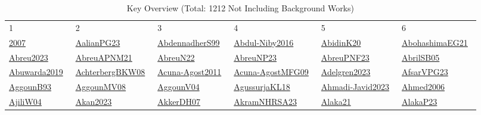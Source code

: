 \begin{longtable}{*{6}{l}}
\rowcolor{white}\caption{Key Overview (Total: 1212 Not Including Background Works)}\\ \toprule
\rowcolor{white}1 & 2 & 3 & 4 & 5 & 6\\ \midrule
\endhead
\bottomrule
\endfoot
\href{../}{2007}~\cite{2007} & \href{../scheduling/works/AalianPG23.pdf}{AalianPG23}~\cite{AalianPG23} & \href{../scheduling/works/AbdennadherS99.pdf}{AbdennadherS99}~\cite{AbdennadherS99} & \href{../scheduling/works/Abdul-Niby2016.pdf}{Abdul-Niby2016}~\cite{Abdul-Niby2016} & \href{../scheduling/works/AbidinK20.pdf}{AbidinK20}~\cite{AbidinK20} & \href{../scheduling/works/AbohashimaEG21.pdf}{AbohashimaEG21}~\cite{AbohashimaEG21}\\ 
\href{../scheduling/works/Abreu2023.pdf}{Abreu2023}~\cite{Abreu2023} & \href{../scheduling/works/AbreuAPNM21.pdf}{AbreuAPNM21}~\cite{AbreuAPNM21} & \href{../scheduling/works/AbreuN22.pdf}{AbreuN22}~\cite{AbreuN22} & \href{../scheduling/works/AbreuNP23.pdf}{AbreuNP23}~\cite{AbreuNP23} & \href{../scheduling/works/AbreuPNF23.pdf}{AbreuPNF23}~\cite{AbreuPNF23} & \href{../scheduling/works/AbrilSB05.pdf}{AbrilSB05}~\cite{AbrilSB05}\\ 
\href{../scheduling/works/Abuwarda2019.pdf}{Abuwarda2019}~\cite{Abuwarda2019} & \href{../scheduling/works/AchterbergBKW08.pdf}{AchterbergBKW08}~\cite{AchterbergBKW08} & \href{../scheduling/works/Acuna-Agost2011.pdf}{Acuna-Agost2011}~\cite{Acuna-Agost2011} & \href{../scheduling/works/Acuna-AgostMFG09.pdf}{Acuna-AgostMFG09}~\cite{Acuna-AgostMFG09} & \href{../scheduling/works/Adelgren2023.pdf}{Adelgren2023}~\cite{Adelgren2023} & \href{../scheduling/works/AfsarVPG23.pdf}{AfsarVPG23}~\cite{AfsarVPG23}\\ 
\href{../scheduling/works/AggounB93.pdf}{AggounB93}~\cite{AggounB93} & \href{../}{AggounMV08}~\cite{AggounMV08} & \href{../}{AggounV04}~\cite{AggounV04} & \href{../scheduling/works/AgussurjaKL18.pdf}{AgussurjaKL18}~\cite{AgussurjaKL18} & \href{../}{Ahmadi-Javid2023}~\cite{Ahmadi-Javid2023} & \href{../scheduling/works/Ahmed2006.pdf}{Ahmed2006}~\cite{Ahmed2006}\\ 
\href{../}{AjiliW04}~\cite{AjiliW04} & \href{../scheduling/works/Akan2023.pdf}{Akan2023}~\cite{Akan2023} & \href{../scheduling/works/AkkerDH07.pdf}{AkkerDH07}~\cite{AkkerDH07} & \href{../scheduling/works/AkramNHRSA23.pdf}{AkramNHRSA23}~\cite{AkramNHRSA23} & \href{../scheduling/works/Alaka21.pdf}{Alaka21}~\cite{Alaka21} & \href{../scheduling/works/AlakaP23.pdf}{AlakaP23}~\cite{AlakaP23}\\ 

\end{longtable}
